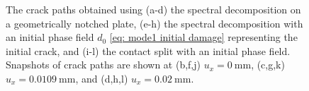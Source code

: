 \begin{figure}[htb!]
\begin{subfigure}[b]{0.06\textwidth}
    \vspace{0.15in}
  \end{subfigure}
  \caption[The crack paths for the Mode-II test.]{The crack paths obtained using (a-d) the spectral decomposition on a geometrically notched plate, (e-h) the spectral decomposition with an initial phase field $d_0$ \eqref{eq: mode1 initial damage} representing the initial crack, and (i-l) the contact split with an initial phase field. Snapshots of crack paths are shown at (b,f,j) $u_x = \SI{0}{\milli\meter}$, (c,g,k) $u_x = \SI{0.0109}{\milli\meter}$, and (d,h,l) $u_x = \SI{0.02}{\milli\meter}$. }
  \label{fig: Chapter4/mode2_crack_path}
\end{figure}
